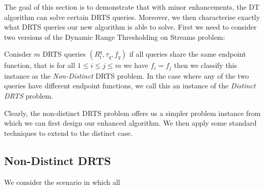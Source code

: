 The goal of this section is to demonstrate that with minor enhancements, the DT algorithm can solve certain DRTS queries. Moreover, we then characterise exactly what DRTS queries our new algorithm is able to solve. First we need to consider two versions of the Dynamic Range Thresholding on Streams problem: 

\begin{definition}
    Conisder $m$ DRTS queries $(R_{t}^q, \tau_q, f_q)$ if all queries share the same endpoint function, that is for all $1\leq i\leq  j\leq m$ we have $f_i = f_j$ then we classify this instance as the \textit{Non-Distinct} DRTS problem. In the case where any of the two queries have different endpoint functions, we call this an instance of the \textit{Distinct DRTS} problem.
\end{definition}

Clearly, the non-distinct DRTS problem offers us a simpler problem instance from which we can first design our enhanced algorithm. We then apply some standard techniques to extend to the distinct case. 

\subsection{Non-Distinct DRTS}
\label{ssec:non-distinct-rts}

We consider the scenario in which all 